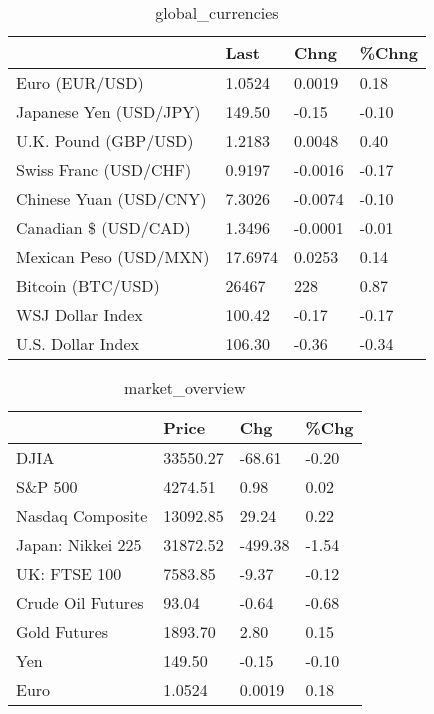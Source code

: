 \documentclass{article}%
\begin{document}
%


\begin{table}[htbp]%
\caption{global\_currencies}%
\centering%
\begin{adjustbox}{width=1\textwidth}%
\begin{tabular}{llll}
\toprule
                       &    Last &    Chng & \%Chng \\
\midrule
        Euro (EUR/USD) &  1.0524 &  0.0019 &  0.18 \\
Japanese Yen (USD/JPY) &  149.50 &   -0.15 & -0.10 \\
  U.K. Pound (GBP/USD) &  1.2183 &  0.0048 &  0.40 \\
 Swiss Franc (USD/CHF) &  0.9197 & -0.0016 & -0.17 \\
Chinese Yuan (USD/CNY) &  7.3026 & -0.0074 & -0.10 \\
  Canadian \$ (USD/CAD) &  1.3496 & -0.0001 & -0.01 \\
Mexican Peso (USD/MXN) & 17.6974 &  0.0253 &  0.14 \\
     Bitcoin (BTC/USD) &   26467 &     228 &  0.87 \\
      WSJ Dollar Index &  100.42 &   -0.17 & -0.17 \\
     U.S. Dollar Index &  106.30 &   -0.36 & -0.34 \\
\bottomrule
\end{tabular}
%
\end{adjustbox}%
\end{table}

%


\begin{table}[htbp]%
\caption{market\_overview}%
\centering%
\begin{adjustbox}{width=1\textwidth}%
\begin{tabular}{llll}
\toprule
                  &    Price &     Chg &  \%Chg \\
\midrule
             DJIA & 33550.27 &  -68.61 & -0.20 \\
          S\&P 500 &  4274.51 &    0.98 &  0.02 \\
 Nasdaq Composite & 13092.85 &   29.24 &  0.22 \\
Japan: Nikkei 225 & 31872.52 & -499.38 & -1.54 \\
     UK: FTSE 100 &  7583.85 &   -9.37 & -0.12 \\
Crude Oil Futures &    93.04 &   -0.64 & -0.68 \\
     Gold Futures &  1893.70 &    2.80 &  0.15 \\
              Yen &   149.50 &   -0.15 & -0.10 \\
             Euro &   1.0524 &  0.0019 &  0.18 \\
\bottomrule
\end{tabular}
%
\end{adjustbox}%
\end{table}

%
\end{document}
